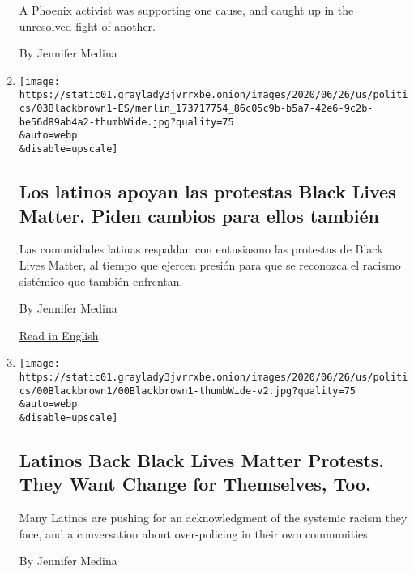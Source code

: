 \begin{enumerate}
  A Phoenix activist was supporting one cause, and caught up in the
  unresolved fight of another.

  By Jennifer Medina
\item
  \href{/es/2020/07/03/espanol/latinos-racismo.html}{}

  \texttt{[image: https://static01.graylady3jvrrxbe.onion/images/2020/06/26/us/politics/03Blackbrown1-ES/merlin\_173717754\_86c05c9b-b5a7-42e6-9c2b-be56d89ab4a2-thumbWide.jpg?quality=75\\\&auto=webp\\\&disable=upscale]}

  \hypertarget{los-latinos-apoyan-las-protestas-black-lives-matter-piden-cambios-para-ellos-tambiuxe9n}{%
  \subsection{Los latinos apoyan las protestas Black Lives Matter. Piden
  cambios para ellos
  también}\label{los-latinos-apoyan-las-protestas-black-lives-matter-piden-cambios-para-ellos-tambiuxe9n}}

  Las comunidades latinas respaldan con entusiasmo las protestas de
  Black Lives Matter, al tiempo que ejercen presión para que se
  reconozca el racismo sistémico que también enfrentan.

  By Jennifer Medina

  \href{https://www.nytimes3xbfgragh.onion/2020/07/03/us/politics/latinos-police-racism-black-lives-matter.html}{Read
  in English}
\item
  \href{/2020/07/03/us/politics/latinos-police-racism-black-lives-matter.html}{}

  \texttt{[image: https://static01.graylady3jvrrxbe.onion/images/2020/06/26/us/politics/00Blackbrown1/00Blackbrown1-thumbWide-v2.jpg?quality=75\\\&auto=webp\\\&disable=upscale]}

  \hypertarget{latinos-back-black-lives-matter-protests-they-want-change-for-themselves-too}{%
  \subsection{Latinos Back Black Lives Matter Protests. They Want Change
  for Themselves,
  Too.}\label{latinos-back-black-lives-matter-protests-they-want-change-for-themselves-too}}

  Many Latinos are pushing for an acknowledgment of the systemic racism
  they face, and a conversation about over-policing in their own
  communities.

  By Jennifer Medina


\end{enumerate}
